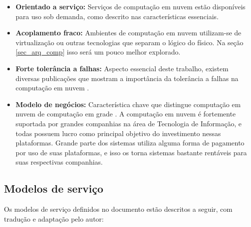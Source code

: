 \documentclass[
	12pt,				%
	a4paper,			%
	english,			%
	french,				%
	spanish,			%
	brazil				%
	]{abntex2}
\begin{document}
\begin{itemize}
    \item \textbf{Orientado a serviço:} Serviços de computação em nuvem estão disponíveis para uso sob demanda, como descrito nas características essenciais.
    \item \textbf{Acoplamento fraco:} Ambientes de computação em nuvem utilizam-se de virtualização ou outras tecnologias que separam o lógico do físico. Na seção \ref{sec_arq_comp} isso será um pouco melhor explorado.
    \item \textbf{Forte tolerância a falhas:} Aspecto essencial deste trabalho, existem diversas publicações que mostram a importância da tolerância a falhas na computação em nuvem \cite{jhawar2012fault, ataallah2015fault, amin2015review, cheraghlou2016survey}.
    \item \textbf{Modelo de negócios:} Característica chave que distingue computação em nuvem de computação em grade \cite[p. 278]{gong2010characteristics}. A computação em nuvem é fortemente suportada por grandes companhias na área de Tecnologia de Informação, e todas possuem lucro como principal objetivo do investimento nessas plataformas. Grande parte dos sistemas utiliza alguma forma de pagamento por uso de suas plataformas, e isso os torna sistemas bastante rentáveis para suas respectivas companhias.
\end{itemize}

\subsection{Modelos de serviço}\label{modelosserv}

Os modelos de serviço definidos no documento estão descritos a seguir, com tradução e adaptação pelo autor:
\end{document}
